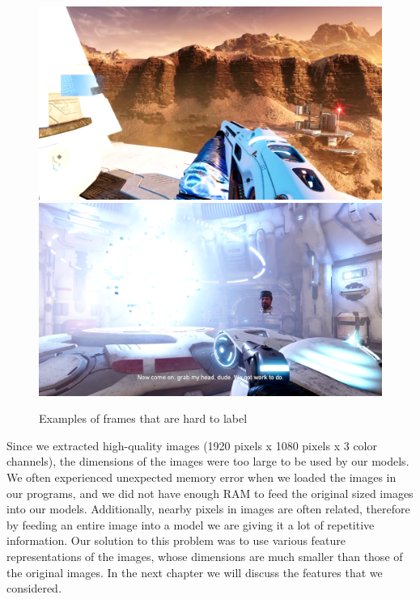 \begin{figure}
\centering
\includegraphics[scale=0.11]{images/line_pixelation_39.png}
\includegraphics[scale=0.11]{images/line_pixelation_68.png}
\caption{Examples of frames that are hard to label}
\label{hard}
\end{figure}


\noindent Since we extracted high-quality images (1920 pixels x 1080 pixels x 3 color channels), the dimensions of the images were too large to be used by our models. We often experienced unexpected memory error when we loaded the images in our programs, and we did not have enough RAM to feed the original sized images into our models. Additionally, nearby pixels in images are often related, therefore by feeding an entire image into a model we are giving it a lot of repetitive information. Our solution to this problem was to use various feature representations of the images, whose dimensions are much smaller than those of the original images. In the next chapter we will discuss the features that we considered.


